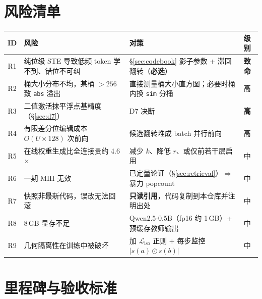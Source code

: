 \documentclass[11pt,a4paper]{ctexart}
\newcommand{\warn}[1]{\textcolor{warnred}{\textbf{#1}}}
\theoremstyle{definition}
\begin{document}
\section{风险清单}\label{sec:risks}

\begin{center}
\begin{tabularx}{\textwidth}{@{}clXl@{}}
\toprule
\textbf{ID} & \textbf{风险} & \textbf{对策} & \textbf{级别} \\
\midrule
R1 & 纯位级 STE 导致低频 token 学不到、错位不可纠 & \S\ref{sec:codebook} 影子参数 + 滞回翻转（\textbf{必选}） & \warn{致命} \\
R2 & 桶大小分布不均，某桶 $>256$ 致 \texttt{abs} 溢出 & 直接测量桶大小直方图；必要时桶内换 \texttt{sim} 分桶 & 高 \\
R3 & 二值激活抹平浮点基精度（\S\ref{sec:d7}） & D7 决断 & \warn{高} \\
R4 & 有限差分位编辑成本 $O(U\times128)$ 次前向 & 候选翻转堆成 batch 并行前向 & 高 \\
R5 & 在线权重生成比全连接贵约 4.6$\times$ & 减少 $k$、降低 $r$、或仅前若干层启用 & 中 \\
R6 & 一期 MIH 无效 & 已定量论证（\S\ref{sec:retrieval}）$\Rightarrow$ 暴力 popcount & 中 \\
R7 & 快照非最新代码，误改无法回滚 & \textbf{只读引用}，代码复制到本仓库并注明出处 & 中 \\
R8 & 8\,GB 显存不足 & Qwen2.5-0.5B（fp16 约 1\,GB）+ 预缓存教师输出 & 中 \\
R9 & 几何隔离性在训练中被破坏 & 加 $\mathcal{L}_{\text{iso}}$ 正则 + 每步监控 $|s(a)\odot s(b)|$ & 中 \\
\bottomrule
\end{tabularx}
\end{center}

\section{里程碑与验收标准}
\end{document}
